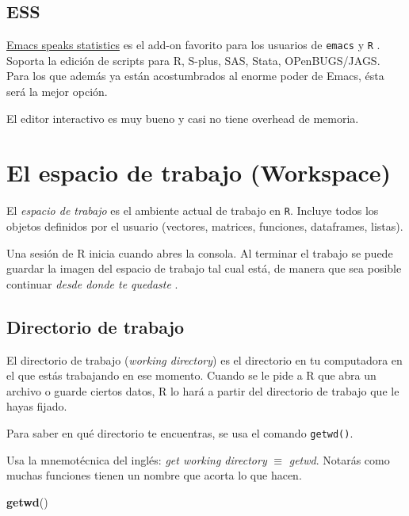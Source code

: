 \documentclass[]{article}
\newenvironment{Shaded}{\begin{snugshade}}{\end{snugshade}}
\newcommand{\KeywordTok}[1]{\textcolor[rgb]{0.13,0.29,0.53}{\textbf{#1}}}
\newcommand{\NormalTok}[1]{#1}
\begin{document}
\subsection{ESS}\label{ess}

\href{http://ess.r-project.org/}{Emacs speaks statistics} es el add-on
favorito para los usuarios de \texttt{emacs} y \texttt{R}
\parencite{rossini2004ess}. Soporta la edición de scripts para R,
S-plus, SAS, Stata, OPenBUGS/JAGS. Para los que además ya están
acostumbrados al enorme poder de Emacs, ésta será la mejor opción.

El editor interactivo es muy bueno y casi no tiene overhead de memoria.

\section{El espacio de trabajo
(Workspace)}\label{el-espacio-de-trabajo-workspace}

El \emph{espacio de trabajo} es el ambiente actual de trabajo en
\texttt{R}. Incluye todos los objetos definidos por el usuario
(vectores, matrices, funciones, dataframes, listas).

Una sesión de R inicia cuando abres la consola. Al terminar el trabajo
se puede guardar la imagen del espacio de trabajo tal cual está, de
manera que sea posible continuar \emph{desde donde te quedaste}
\parencite[][p. 11]{kabacoff2015r}.

\subsection{Directorio de trabajo}\label{directorio-de-trabajo}

El directorio de trabajo (\emph{working directory}) es el directorio en
tu computadora en el que estás trabajando en ese momento. Cuando se le
pide a R que abra un archivo o guarde ciertos datos, R lo hará a partir
del directorio de trabajo que le hayas fijado.

Para saber en qué directorio te encuentras, se usa el comando
\texttt{getwd()}.

\begin{curiosidad} 
Usa la mnemotécnica del inglés: \textit{get working directory} $\equiv$ \textit{getwd}. 
Notarás como muchas funciones tienen un nombre que acorta lo que hacen.
\end{curiosidad}

\begin{Shaded}
\begin{Highlighting}[]
\KeywordTok{getwd}\NormalTok{()}
\end{Highlighting}
\end{Shaded}
\end{document}
